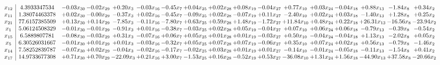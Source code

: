 \documentclass[9pt]{article}
\begin{document}
 \[\begin{array}{c| c c@{\hskip 2pt} c@{\hskip 2pt} c@{\hskip 2pt} c@{\hskip 2pt} c@{\hskip 2pt} c@{\hskip 2pt} c@{\hskip 2pt} c@{\hskip 2pt} c@{\hskip 2pt} c@{\hskip 2pt} c@{\hskip 2pt} c@{\hskip 2pt} c@{\hskip 2pt} c@{\hskip 2pt} c@{\hskip 2pt} }
 x_{12}   &  4.3933347534 & -0.03 x_{30} & -0.02 x_{29} & +  0.20 x_{3} & -0.03 x_{16} & -0.45 x_{7} & +  0.04 x_{25} & +  0.02 x_{28} & +  0.08 x_{19} & -0.04 x_{27} & +  0.77 x_{10} & +  0.03 x_{24} & -0.04 x_{18} & +  0.88 x_{13} & -1.84 x_{8} & +  0.34 x_{2}\\
 x_{11}   &  1.38074463378 & +  0.02 x_{30} & -0.00 x_{29} & -0.37 x_{3} & +  0.02 x_{16} & -0.45 x_{7} & -0.09 x_{25} & +  0.02 x_{28} & -0.07 x_{19} & +  0.11 x_{27} & -2.40 x_{10} & +  0.02 x_{24} & +  0.03 x_{18} & -1.40 x_{13} & +  1.28 x_{8} & +  0.25 x_{2}\\
 x_{21}   &  77.6157385509 & +  0.13 x_{30} & +  0.14 x_{29} & -7.85 x_{3} & -0.11 x_{16} & -7.80 x_{7} & +  0.63 x_{25} & +  0.59 x_{28} & +  1.48 x_{19} & -1.72 x_{27} & + 11.84 x_{10} & +  0.48 x_{24} & +  0.22 x_{18} & + 26.31 x_{13} & -16.56 x_{8} & -23.94 x_{2}\\
 x_{1}   &  5.06124508329 & -0.01 x_{30} & -0.01 x_{29} & -0.91 x_{3} & +  0.01 x_{16} & -0.38 x_{7} & -0.03 x_{25} & +  0.02 x_{28} & +  0.05 x_{19} & -0.04 x_{27} & +  0.07 x_{10} & +  0.06 x_{24} & +  0.06 x_{18} & -0.79 x_{13} & -0.39 x_{8} & -0.54 x_{2}\\
 x_{15}   &  6.5889807781 & -0.08 x_{30} & -0.03 x_{29} & +  0.31 x_{3} & -0.07 x_{16} & +  0.06 x_{7} & +  0.05 x_{25} & +  0.01 x_{28} & +  0.01 x_{19} & -0.03 x_{27} & +  0.50 x_{10} & -0.04 x_{24} & -0.04 x_{18} & +  1.13 x_{13} & -2.02 x_{8} & +  0.05 x_{2}\\
 x_{5}   &  6.30526031667 & -0.01 x_{30} & +  0.01 x_{29} & +  0.01 x_{3} & -0.03 x_{16} & -0.32 x_{7} & +  0.05 x_{25} & +  0.07 x_{28} & +  0.07 x_{19} & -0.06 x_{27} & +  0.35 x_{10} & +  0.07 x_{24} & +  0.02 x_{18} & +  0.56 x_{13} & -0.79 x_{8} & -1.46 x_{2}\\
 x_{14}   &  7.58252839787 & -0.07 x_{30} & +  0.02 x_{29} & -0.04 x_{3} & -0.02 x_{16} & -0.17 x_{7} & -0.02 x_{25} & +  0.03 x_{28} & +  0.01 x_{19} & +  0.01 x_{27} & -0.14 x_{10} & -0.01 x_{24} & -0.05 x_{18} & -0.11 x_{13} & -1.54 x_{8} & +  0.41 x_{2}\\
 x_{17}   &  14.9733677308 & +  0.71 x_{30} & +  0.70 x_{29} & -22.09 x_{3} & +  0.21 x_{16} & +  3.00 x_{7} & -1.53 x_{25} & +  0.16 x_{28} & -0.52 x_{19} & +  0.53 x_{27} & -36.08 x_{10} & +  1.31 x_{24} & +  1.56 x_{18} & -44.90 x_{13} & + 37.58 x_{8} & -20.66 x_{2}\\

\end{array}\]
\end{document}
